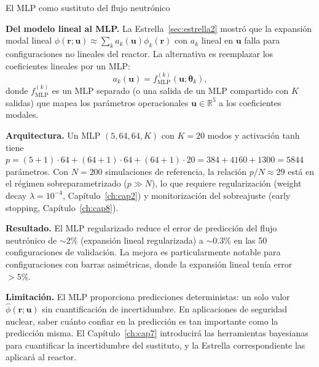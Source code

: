 \begin{estrella}{El MLP como sustituto del flujo neutrónico}
\label{sec:estrella4}

\textbf{Del modelo lineal al MLP.}
La Estrella~\ref{sec:estrella2} mostró que la expansión modal lineal
$\phi(\bm{r};\bm{u}) \approx \sum_k a_k(\bm{u})\phi_k(\bm{r})$ con
$a_k$ lineal en $\bm{u}$ falla para configuraciones no lineales del
reactor. La alternativa es reemplazar los coeficientes lineales por un
MLP:
\[
  a_k(\bm{u}) = f_{\text{MLP}}^{(k)}(\bm{u};\bm{\theta}_k),
\]
donde $f_{\text{MLP}}^{(k)}$ es un MLP separado (o una salida de un MLP
compartido con $K$ salidas) que mapea los parámetros operacionales
$\bm{u} \in \mathbb{R}^5$ a los coeficientes modales.

\textbf{Arquitectura.}
Un MLP $(5, 64, 64, K)$ con $K = 20$ modos y activación tanh tiene
$p = (5+1)\cdot 64 + (64+1)\cdot 64 + (64+1)\cdot 20 = 384 + 4160 +
1300 = 5844$ parámetros. Con $N = 200$ simulaciones de referencia, la
relación $p/N \approx 29$ está en el régimen sobreparametrizado ($p \gg
N$), lo que requiere regularización (weight decay
$\lambda = 10^{-4}$, Capítulo~\ref{ch:cap2}) y monitorización del
sobreajuste (early stopping, Capítulo~\ref{ch:cap8}).

\textbf{Resultado.}
El MLP regularizado reduce el error de predicción del flujo neutrónico
de $\sim 2\%$ (expansión lineal regularizada) a $\sim 0.3\%$ en las 50
configuraciones de validación. La mejora es particularmente notable para
configuraciones con barras asimétricas, donde la expansión lineal tenía
error $> 5\%$.

\textbf{Limitación.}
El MLP proporciona predicciones deterministas: un solo valor
$\hat{\phi}(\bm{r};\bm{u})$ sin cuantificación de incertidumbre. En
aplicaciones de seguridad nuclear, saber cuánto confiar en la predicción
es tan importante como la predicción misma. El Capítulo~\ref{ch:cap7}
introducirá las herramientas bayesianas para cuantificar la
incertidumbre del sustituto, y la Estrella correspondiente las aplicará
al reactor.
\end{estrella}

\printbibliography[heading=subbibliography]